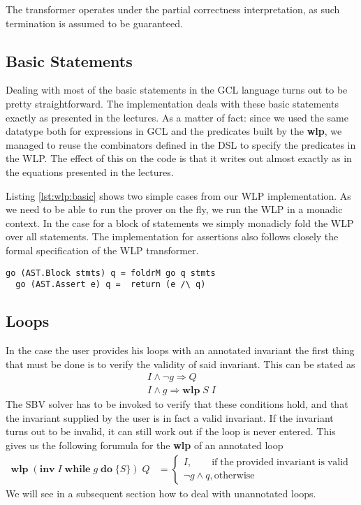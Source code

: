 \documentclass[]{scrartcl}
\newcommand{\IWHILE}[3]{\ensuremath{\mathbf{inv}\;#1\;\mathbf{while}\;#2\;\mathbf{do}\;\{#3\}}}
\newcommand{\WLP}[2]{\ensuremath{\mathbf{wlp}\;#1\;#2}}
\begin{document}
The transformer operates under the partial correctness interpretation, as such
termination is assumed to be guaranteed.

\subsection{Basic Statements}

Dealing with most of the basic statements in the GCL language turns out to
be pretty straightforward. The implementation deals with these basic statements
exactly as presented in the lectures.
As a matter of fact: since we used the same datatype both for expressions in GCL
and the predicates built by the \textbf{wlp}, we managed to reuse the combinators defined
in the DSL to specify the predicates in the WLP. The effect of this on the code
is that it writes out almost exactly as in the equations presented in the lectures.

Listing \ref{lst:wlp:basic} shows two simple cases from our WLP implementation.
As we need to be able to run the prover on the fly, we run the WLP in a monadic context.
In the case for a block of statements we simply monadicly fold the WLP over all statements.
The implementation for assertions also follows closely the formal specification of the
WLP transformer.

\begin{lstlisting}[caption=WLP implementation example, label=lst:wlp:basic]
  go (AST.Block stmts) q = foldrM go q stmts
  go (AST.Assert e) q =  return (e /\ q)
\end{lstlisting}

\subsection{Loops}

In the case the user provides his loops with an annotated invariant the first
thing that must be done is to verify the validity of said invariant.
This can be stated as
\begin{align}
  I \land \neg g \Rightarrow Q \\
  I \land g \Rightarrow \WLP{S}{I}
\end{align}
The SBV solver has to be invoked to verify that these conditions hold, and that
the invariant supplied by the user is in fact a valid invariant.
If the invariant turns out to be invalid, it can still work out if the loop
is never entered. This gives us the following forumula for the \textbf{wlp} of an annotated
loop
\begin{align}
  \WLP{(\IWHILE{I}{g}{S})}{Q} &=
    \begin{cases}
      I, \qquad  \mathrm{if \; the \; provided \; invariant \; is \; valid}\\
      \neg g \land q, \mathrm{otherwise}
    \end{cases}
\end{align}
We will see in a subsequent section how to deal with unannotated loops.
\end{document}
